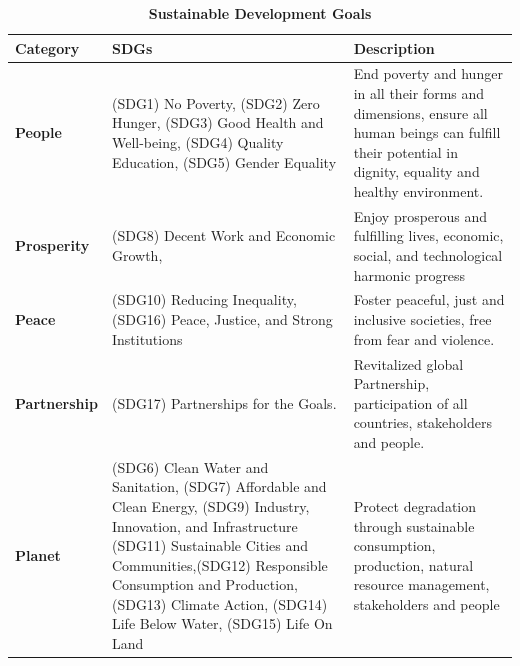 \documentclass[10pt]{IETBook}
\begin{document}
\begin{table}[!t]
	\begin{center}
		\begin{tabular}{|p{0.68in}|p{1.75in}|p{2in}| } \hline
			Category & SDGs & Description \\ \hline 
			
			{\bf People} & (SDG1) No Poverty, \newline (SDG2) Zero Hunger, \newline (SDG3) Good Health and Well-being, \newline (SDG4) Quality Education, \newline (SDG5) Gender Equality & End poverty and hunger in all their forms and dimensions, ensure all human beings can fulfill their potential in dignity, equality and healthy environment. \\ \hline   
			
			{\bf Prosperity} & (SDG8) Decent Work and Economic Growth, & Enjoy prosperous and fulfilling lives, economic, social, and technological harmonic progress \\ \hline 
			
			{\bf Peace} & (SDG10) Reducing Inequality, \newline (SDG16) Peace, Justice, and Strong Institutions & Foster peaceful, just and inclusive societies, free from fear and violence. \\ \hline 
			
			{\bf Partnership} & (SDG17) Partnerships for the Goals. & Revitalized global Partnership, participation of all countries, stakeholders and people. \\ \hline 
			
			{\bf Planet} & (SDG6) Clean Water and Sanitation, \newline (SDG7) Affordable and Clean Energy, \newline (SDG9) Industry, Innovation, and Infrastructure \newline (SDG11) Sustainable Cities and Communities,\newline (SDG12) Responsible Consumption and Production, \newline (SDG13) Climate Action, \newline (SDG14) Life Below Water, \newline(SDG15) Life On Land & Protect degradation through sustainable consumption, production, natural resource management,  stakeholders and people \\ \hline 
		\end{tabular}
		\caption{\bf Sustainable Development Goals}
		\label{sdg}
	\end{center}
\end{table}
\end{document}
